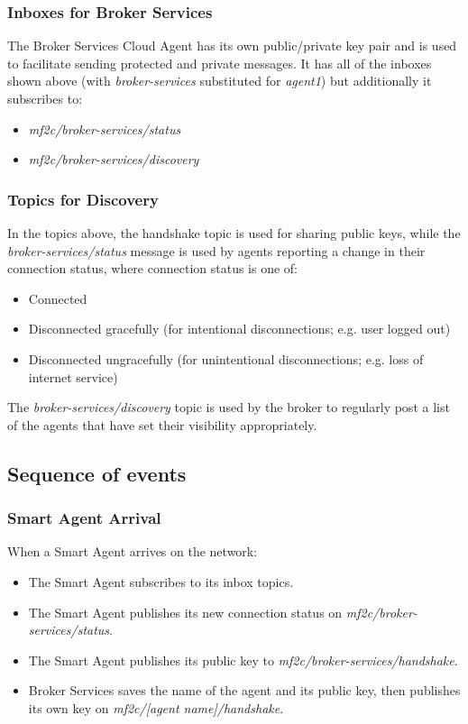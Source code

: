 \subsubsection{Inboxes for Broker Services}
The Broker Services Cloud Agent has its own public/private key pair and is used to facilitate sending protected and private messages. It has all of the inboxes shown above (with \textit{broker-services} substituted for \textit{agent1}) but additionally it subscribes to:

\begin{itemize}
    \item \textit{mf2c/broker-services/status}
    \item \textit{mf2c/broker-services/discovery}
\end{itemize}

\subsubsection{Topics for Discovery}

In the topics above, the handshake topic is used for sharing public keys, while the \textit{broker-services/status} message is used by agents reporting a change in their connection status, where connection status is one of:
\begin{itemize}
    \item Connected
    \item Disconnected gracefully (for intentional disconnections; e.g. user logged out)
    \item Disconnected ungracefully (for unintentional disconnections; e.g. loss of internet service)
\end{itemize}

The \textit{broker-services/discovery} topic is used by the broker to regularly post a list of the agents that have set their visibility appropriately.

\subsection{Sequence of events}

\subsubsection{Smart Agent Arrival}
When a Smart Agent arrives on the network:
\begin{itemize}
    \item The Smart Agent subscribes to its inbox topics.
    \item The Smart Agent publishes its new connection status on \textit{mf2c/broker-services/status}.
    \item The Smart Agent publishes its public key to \textit{mf2c/broker-services/handshake}.
    \item Broker Services saves the name of the agent and its public key, then publishes its own key on \textit{mf2c/[agent name]/handshake}.
\end{itemize}

